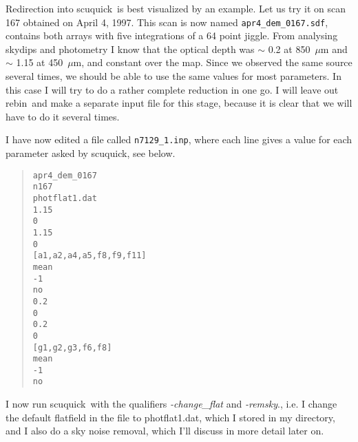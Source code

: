 \documentclass[twoside,11pt]{article}
\newenvironment{myquote}{\begin{quote}\begin{small}}{\end{small}\end{quote}}
\newcommand{\task}[1]{\textsf{#1}}
\newcommand{\rebin}{\xref{\task{rebin}}{sun216}{REBIN}}
\newcommand{\scuquick}{\xref{\task{scuquick}}{sun216}{SCUQUICK}}
\newcommand{\xref}[3]{#1}
\begin{document}
Redirection into \scuquick\ is best visualized by an example. Let us try it on
scan 167 obtained on April 4, 1997. This scan is now named
\texttt{apr4\_dem\_0167.sdf}, contains both arrays with five integrations of a
64 point jiggle. From analysing skydips and photometry I know that the optical
depth was $\sim$ 0.2 at 850~$\mu$m and $\sim$ 1.15 at 450~$\mu$m, and constant
over the map. Since we observed the same source several times, we should be
able to use the same values for most parameters. In this case I will try to do
a rather complete reduction in one go. I will leave out \rebin\ and make a
separate input file for this stage, because it is clear that we will have to
do it several times.

I have now edited a file called \texttt{n7129\_1.inp}, where each line gives a
value for each parameter asked by \scuquick, see below.

\begin{myquote} \begin{verbatim}
apr4_dem_0167
n167
photflat1.dat
1.15
0
1.15
0
[a1,a2,a4,a5,f8,f9,f11]
mean
-1
no
0.2
0
0.2
0
[g1,g2,g3,f6,f8]
mean
-1
no
\end{verbatim} \end{myquote}

I now run \scuquick\ with the qualifiers {\it -change\_flat}
and {\it -remsky}., i.e. I change the default flatfield in the file to
photflat1.dat, which I stored in my directory, and I also do a sky noise
removal, which I'll discuss in more detail later on.
\end{document}
